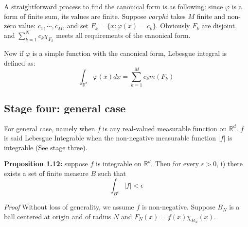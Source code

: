 \documentclass[
]{article}
\begin{document}
A straightforward process to find the canonical form is as following: since \(\varphi\) is a form of finite sum,
its values are finite. Suppose \(varphi\) takes \(M\) finite and non-zero value: \(c_1, \cdots, c_M\), and
set \(F_k=\{x: \varphi(x)=c_k\}\). Obviously \(F_k\) are disjoint, and \(\sum_{k=1}^Nc_k\chi_{F_k}\) meets all
requirements of the canonical form.

Now if \(\varphi\) is a simple function with the canonical form, Lebesgue integral is defined as:
\[\int_{\mathbb{R}^d}\varphi(x)dx=\sum_{k=1}^Mc_km(F_k)\]


\subsection{Stage four: general case}
For general case, namely when \(f\) is any real-valued measurable function on \(\mathbb{R}^d\).
\(f\) is said Lebesgue Integrable when the non-negative measurable function \(|f|\) is integrable
(See stage three).

\textbf{Proposition 1.12:} suppose \(f\) is integrable on \(\mathbb{R}^d\). Then for every \(\epsilon > 0\),
i) there exists a set of finite measure \(B\) such that
\[\int_{B^c}|f|<\epsilon\]

\textit{Proof}
Without loss of generality, we assume \(f\) is non-negative. Suppose \(B_N\) is a ball centered at origin and of radius 
\(N\) and \(F_N(x) = f(x)\chi_{B_N}(x)\).
\end{document}
